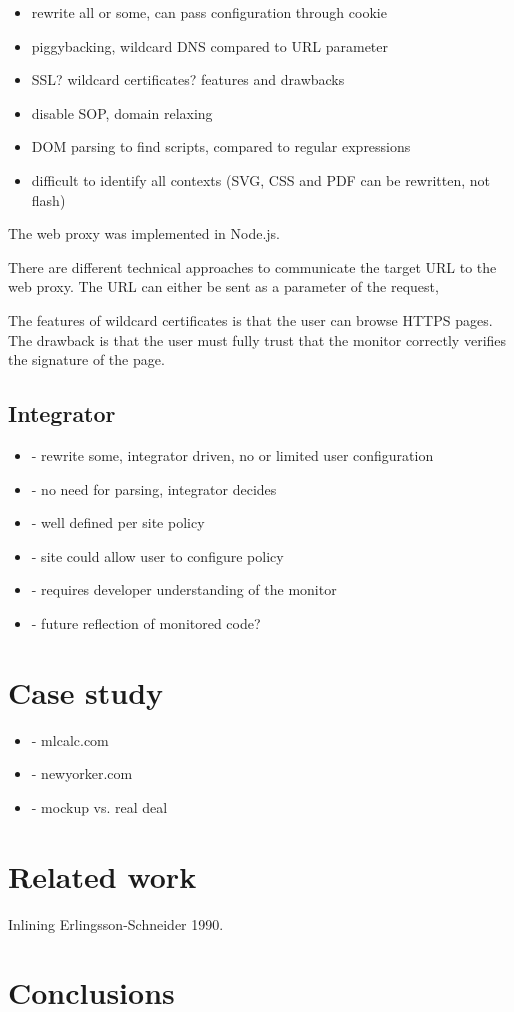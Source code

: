\documentclass{llncs}
\begin{document}
\begin{itemize}
\item rewrite all or some, can pass configuration through cookie
\item piggybacking, wildcard DNS compared to URL parameter
\item SSL? wildcard certificates? features and drawbacks 
\item disable SOP, domain relaxing
\item DOM parsing to find scripts, compared to regular expressions
\item difficult to identify all contexts (SVG, CSS and PDF can be rewritten, not flash)
\end{itemize}


The web proxy was implemented in Node.js. 

There are different technical approaches to communicate the target URL to the web 
proxy. The URL can either be sent as a parameter of the request, 

The features of wildcard certificates is that the user can browse HTTPS pages. The drawback is that the user must fully trust that the monitor correctly verifies the signature of the page.

\subsection{Integrator}

\begin{itemize}
\item- rewrite some, integrator driven, no or limited user configuration
\item- no need for parsing, integrator decides
\item- well defined per site policy
\item- site could allow user to configure policy
\item- requires developer understanding of the monitor
\item- future reflection of monitored code?
\end{itemize}


\section{Case study}
\label{sec:case}

\begin{itemize}
\item- mlcalc.com
\item- newyorker.com
\item- mockup vs. real deal
\end{itemize}

\section{Related work}
\label{sec:related}

Inlining Erlingsson-Schneider 1990.

\section{Conclusions}
\label{sec:conc}



\end{document}
